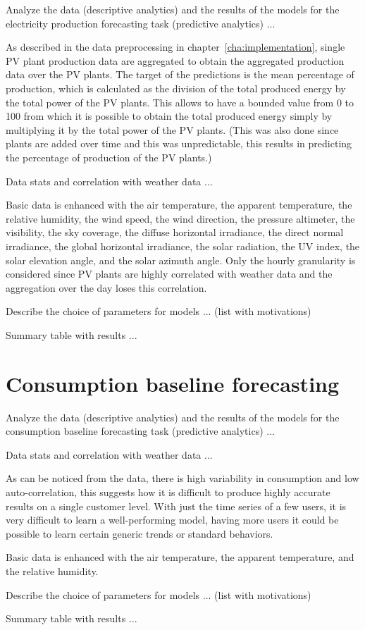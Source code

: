 Analyze the data (descriptive analytics) and the results of the models for the electricity production forecasting task (predictive analytics) ...

As described in the data preprocessing in chapter~\ref{cha:implementation}, single PV plant production data are aggregated to obtain the aggregated production data over the PV plants.
The target of the predictions is the mean percentage of production, which is calculated as the division of the total produced energy by the total power of the PV plants.
This allows to have a bounded value from 0 to 100 from which it is possible to obtain the total produced energy simply by multiplying it by the total power of the PV plants.
(This was also done since plants are added over time and this was unpredictable, this results in predicting the percentage of production of the PV plants.)

Data stats and correlation with weather data ...

Basic data is enhanced with the air temperature, the apparent temperature, the relative humidity, the wind speed, the wind direction, the pressure altimeter, the visibility, the sky coverage, the diffuse horizontal irradiance, the direct normal irradiance, the global horizontal irradiance, the solar radiation, the UV index, the solar elevation angle, and the solar azimuth angle.
Only the hourly granularity is considered since PV plants are highly correlated with weather data and the aggregation over the day loses this correlation.

Describe the choice of parameters for models ... (list with motivations)

Summary table with results ...


\section{Consumption baseline forecasting} 
\label{sec:baselineval}
\vspace{0.2 cm}

Analyze the data (descriptive analytics) and the results of the models for the consumption baseline forecasting task (predictive analytics) ...

Data stats and correlation with weather data ...

As can be noticed from the data, there is high variability in consumption and low auto-correlation, this suggests how it is difficult to produce highly accurate results on a single customer level.
With just the time series of a few users, it is very difficult to learn a well-performing model, having more users it could be possible to learn certain generic trends or standard behaviors.

Basic data is enhanced with the air temperature, the apparent temperature, and the relative humidity.

Describe the choice of parameters for models ... (list with motivations)

Summary table with results ...
